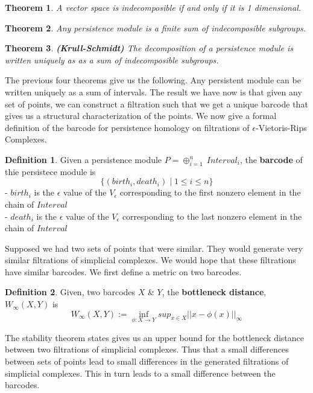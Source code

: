 \documentclass[12pt, a4paper, twocolumn, fullpage]{article}
\theoremstyle{plain}
\newtheorem{thm}{Theorem}[section]
\theoremstyle{definition}
\newtheorem{defn}{Definition}[section]
\theoremstyle{remark}
\begin{document}
\begin{thm}
A vector space is indecomposible if and only if it is 1 dimensional.
\end{thm}

\begin{thm}
Any persistence module is a finite sum of indecomposible subgroups.
\end{thm}

\begin{thm}
\textbf{(Krull-Schmidt)} The decomposition of a persistence module is written uniquely as as a sum of indecomposible subgroups. 
\end{thm}

The previous four theorems give us the following. Any persistent module can be written uniquely as a sum of intervals. The result we have now is that given any set of points, we can construct a filtration such that we get a unique barcode that gives us a structural characterization of the points. We now give a formal definition of the barcode for persistence homology on filtrations of $\epsilon$-Vietoris-Rips Complexes.

\begin{defn}
Given a persistence module $P = \oplus_{i=1}^{n} \ Interval_i$, the \textbf{barcode} of thie persistece module is 
$$\{(birth_i,death_i) \mid 1 \leq i \leq n \}$$
- $birth_i$ is the $\epsilon$ value of the $V_{\epsilon}$ corresponding to the first nonzero element in the chain of $Interval$\\
- $death_i$ is the $\epsilon$ value of the $V_{\epsilon}$ corresponding to the last nonzero element in the chain of $Interval$\\
\end{defn}

Supposed we had two sets of points that were similar. They would generate very similar filtrations of simplicial complexes. We would hope that these filtrations have similar barcodes. We first define a metric on two barcodes.

\begin{defn}
Given, two barcodes $X$ \& $Y$, the \textbf{bottleneck distance}, $W_{\infty}(X,Y)$ is
$$ W_{\infty}(X,Y) := \inf_{\phi:X \rightarrow Y} sup_{x \in X} || x - \phi(x)||_{\infty}$$
\end{defn}

The stability theorem states gives us an upper bound for the bottleneck distance between two filtrations of simplicial complexes. Thus that a small differences  between sets of points lead to small differences in the generated filtrations of simplicial complexes. This in turn leads to a small difference between the barcodes. 
\end{document}

